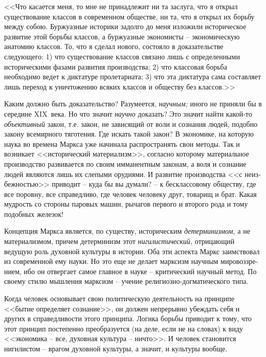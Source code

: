 \documentclass{book}
\begin{document}
<<Что касается меня, то мне не принадлежит ни та заслуга, что я открыл существование классов в современном обществе, ни та, что я 
открыл их борьбу между собою. Буржуазные историки задолго до меня изложили историческое развитие этой борьбы классов, а 
буржуазные экономисты -- экономическую анатомию классов. То, что я сделал нового, состояло в доказательстве следующего: 1) что 
существование классов связано лишь с определенными историческими фазами развития производства; 2) что классовая борьба 
необходимо ведет к диктатуре пролета­риата; 3) что эта диктатура сама составляет лишь переход к уничтожению всяких классов и 
обществу без классов.>>

Каким должно быть доказательство? Разумеется, \textit{научным;} иного не приняли бы в середине XIX~века. Но что значит 
\textit{научно} доказать?  Это значит найти какой-то \textit{объективный}  закон, т.е. закон, не зависящий от воли и сознания 
людей, подобно закону всемирного тяготения. Где искать такой закон? В экономике, на которую наука во времена Маркса уже начинала 
распространять свои методы. Так и возникает <<исторический материализм>>, со­гласно которому материальное производство развивается 
по своим имманентным законам, а воля и сознание людей являются лишь их слепыми орудиями. И развитие производства <<с неиз­
бежностью>> приводит -- куда бы вы думали? -- к бесклассовому обществу, где все поровну, все справедливо, где человек челове­ку 
друг, товарищ и брат. Какая мудрость со стороны паровых машин, рычагов первого и второго рода и тому подобных желе­зок!

Концепция Маркса является, по существу, историческим \textit{детерминизмом,}  а не материализмом, причем детерминизм этот 
\textit{нигилистический,}  отрицающий ведущую роль духовной культуры в истории. Оба эти аспекта Маркс заимствовал из современной 
ему науки. Но это еще не делает марксизм научным мировоззре­нием, ибо он отвергает самое главное в науке -- критический научный 
метод. По своему стилю мышления марксизм -- учение религиозно-догматического типа.

Когда человек основывает свою политическую деятельность на принципе <<бытие определяет сознание>>, он должен непрерывно убеждать 
себя и других в справедливости этого принципа. Логика борьбы приводит к тому, что этот принцип постепенно преобразуется (на 
деле, если не на словах) к виду <<экономика -- все, духовная культура -- ничто>>. И человек становится нигилистом -- врагом 
духовной культуры, а значит, и культуры вообще.
\end{document}
